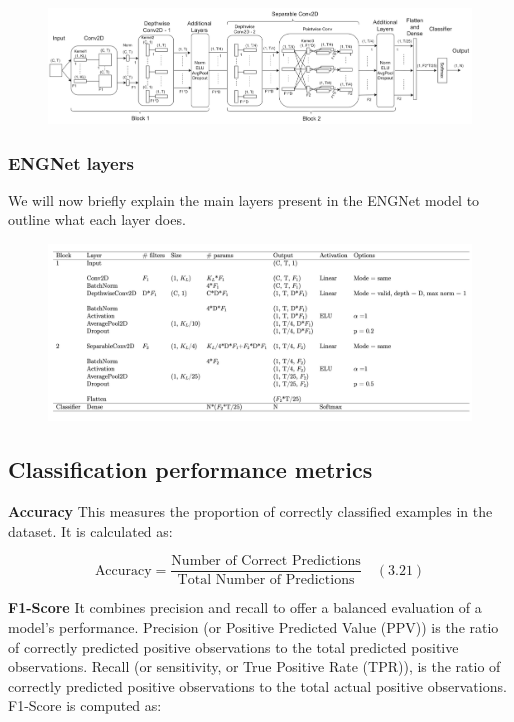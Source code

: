 \documentclass{Configuration_Files/PoliMi3i_thesis}
\begin{document}
\begin{figure}[H]
	\includegraphics[scale=0.4]{engNet_arch.png}
	\centering
\end{figure}
	

\subsubsection{ENGNet layers}

We will now briefly explain the main layers present in the ENGNet model to outline what each layer does.



\begin{figure}[H]
	\includegraphics[scale=0.25]{engNet_layers.png}
	\centering
\end{figure}

\subsection{Classification performance metrics}

\textbf{Accuracy} \quad This measures the proportion of correctly classified examples in the dataset. It is calculated as:

\begin{equation}
\text{Accuracy} = \frac{\text{Number of Correct Predictions}}{\text{Total Number of Predictions}} \quad (3.21)
\end{equation}

\textbf{F1-Score} \quad It combines precision and recall to offer a balanced evaluation of a model’s performance. Precision (or Positive Predicted Value (PPV)) is the ratio of correctly predicted positive observations to the total predicted positive observations. Recall (or sensitivity, or True Positive Rate (TPR)), is the ratio of correctly predicted positive observations to the total actual positive observations. F1-Score is computed as:
\end{document}

